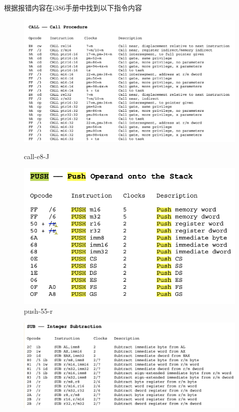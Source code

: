\documentclass[UTF8,a4paper,10pt]{ctexart}
\begin{document}
{    根据报错内容在i386手册中找到以下指令内容
    \begin{figure}[!h]
        \begin{minipage}[h]{0.5\linewidth}
        \centering
        \includegraphics[scale=0.35]{fig/2.png}
        \caption{call-e8-J}
        \end{minipage}%
        \hfill
        \begin{minipage}[h]{0.5\linewidth}
        \centering
        \includegraphics[scale=0.35]{fig/3.png}
        \caption{push-55-r}
        \end{minipage}
    \end{figure}
    \begin{figure}[!h]
        \begin{minipage}[h]{0.5\linewidth}
        \centering
        \includegraphics[scale=0.35]{fig/4.png}

\end{minipage}
\end{figure}}
\end{document}
